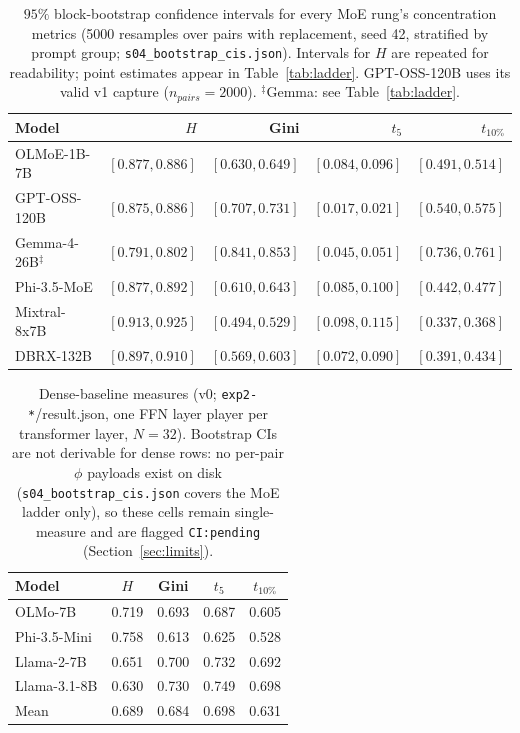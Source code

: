 \documentclass[sigconf]{acmart}
\begin{document}
\begin{table}[t]
\centering\small
\begin{tabular}{lrrrr}
\toprule
Model & $H$ & Gini & $t_5$ & $t_{10\%}$ \\
\midrule
OLMoE-1B-7B          & $[0.877,0.886]$ & $[0.630,0.649]$ & $[0.084,0.096]$ & $[0.491,0.514]$ \\
GPT-OSS-120B         & $[0.875,0.886]$ & $[0.707,0.731]$ & $[0.017,0.021]$ & $[0.540,0.575]$ \\
Gemma-4-26B$^{\ddagger}$ & $[0.791,0.802]$ & $[0.841,0.853]$ & $[0.045,0.051]$ & $[0.736,0.761]$ \\
Phi-3.5-MoE         & $[0.877,0.892]$ & $[0.610,0.643]$ & $[0.085,0.100]$ & $[0.442,0.477]$ \\
Mixtral-8x7B        & $[0.913,0.925]$ & $[0.494,0.529]$ & $[0.098,0.115]$ & $[0.337,0.368]$ \\
DBRX-132B           & $[0.897,0.910]$ & $[0.569,0.603]$ & $[0.072,0.090]$ & $[0.391,0.434]$ \\
\bottomrule
\end{tabular}
\caption{$95\%$ block-bootstrap confidence intervals for every MoE rung's
concentration metrics (5000 resamples over pairs with replacement, seed 42,
stratified by prompt group; \texttt{s04\_bootstrap\_cis.json}). Intervals
for $H$ are repeated for readability; point estimates appear in
Table~\ref{tab:ladder}. GPT-OSS-120B uses its valid v1 capture
($n_{pairs}=2000$). $^{\ddagger}$Gemma: see Table~\ref{tab:ladder}.}
\label{tab:cis}
\end{table}

\begin{table}[t]
\centering\small
\begin{tabular}{lcccc}
\toprule
Model & $H$ & Gini & $t_5$ & $t_{10\%}$ \\
\midrule
OLMo-7B        & 0.719 & 0.693 & 0.687 & 0.605 \\
Phi-3.5-Mini   & 0.758 & 0.613 & 0.625 & 0.528 \\
Llama-2-7B     & 0.651 & 0.700 & 0.732 & 0.692 \\
Llama-3.1-8B   & 0.630 & 0.730 & 0.749 & 0.698 \\
\midrule
Mean           & 0.689 & 0.684 & 0.698 & 0.631 \\
\bottomrule
\end{tabular}
\caption{Dense-baseline measures (v0; \texttt{exp2-*}/result.json, one FFN
layer player per transformer layer, $N = 32$). Bootstrap CIs are not
derivable for dense rows: no per-pair $\phi$ payloads exist on disk
(\texttt{s04\_bootstrap\_cis.json} covers the MoE ladder only), so these
cells remain single-measure and are flagged \texttt{CI:pending}
(Section~\ref{sec:limits}).}
\label{tab:dense}
\end{table}
\end{document}
